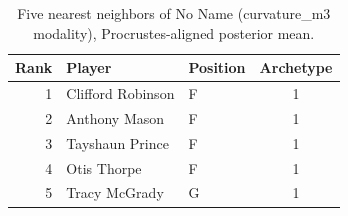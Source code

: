 \begin{table}[htbp]
  \centering\small
  \begin{tabular}{rllc}
    \toprule
    Rank & Player & Position & Archetype \\
    \midrule
    1 & Clifford Robinson & F & 1 \\
    2 & Anthony Mason & F & 1 \\
    3 & Tayshaun Prince & F & 1 \\
    4 & Otis Thorpe & F & 1 \\
    5 & Tracy McGrady & G & 1 \\
    \bottomrule
  \end{tabular}
  \caption{Five nearest neighbors of No Name (curvature_m3 modality), Procrustes-aligned posterior mean.}
  \label{tab:No_Name_neighbors_curvature_m3}
\end{table}

